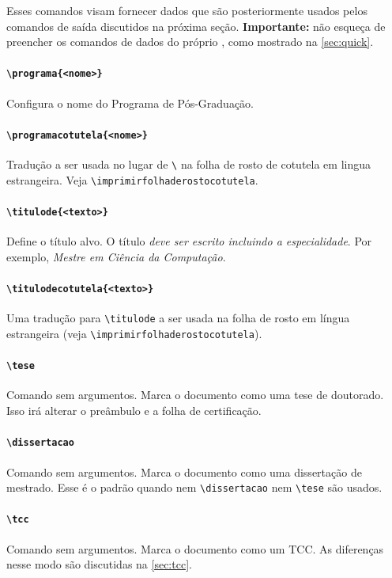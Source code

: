 \documentclass[embeddedlogo]{ufsc-thesis-rn46-2019}
\newcommand{\lacmd}[1]{\texttt{\textbackslash{}#1}}
\begin{document}
Esses comandos visam fornecer dados que são posteriormente usados pelos
comandos de saída discutidos na próxima seção. \textbf{Importante:} não esqueça
de preencher os comandos de dados do próprio \abnTeX, como mostrado na
\autoref{sec:quick}.

\paragraph*{\lacmd{programa\{<nome>\}}} Configura o nome do Programa de
Pós-Graduação.

\paragraph*{\lacmd{programacotutela\{<nome>\}}} Tradução a ser usada no lugar de
\lacmd{\programa} na folha de rosto de cotutela em lingua estrangeira. Veja
\lacmd{imprimirfolhaderostocotutela}.

\paragraph*{\lacmd{titulode\{<texto>\}}} Define o título alvo.  O título
\textit{deve ser escrito incluindo a especialidade}. Por exemplo, \emph{Mestre
  em Ciência da Computação}.

\paragraph*{\lacmd{titulodecotutela\{<texto>\}}} Uma tradução para
\lacmd{titulode} a ser usada na folha de rosto em língua estrangeira (veja
\lacmd{imprimirfolhaderostocotutela}).

\paragraph*{\lacmd{tese}} Comando sem argumentos. Marca o documento como uma
tese de doutorado. Isso irá alterar o preâmbulo e a folha de certificação.

\paragraph*{\lacmd{dissertacao}} Comando sem argumentos. Marca o documento como
uma dissertação de mestrado. Esse é o padrão quando nem \lacmd{dissertacao} nem
\lacmd{tese} são usados.

\paragraph*{\lacmd{tcc}} Comando sem argumentos. Marca o documento como um
TCC. As diferenças nesse modo são discutidas na \autoref{sec:tcc}.
\end{document}
